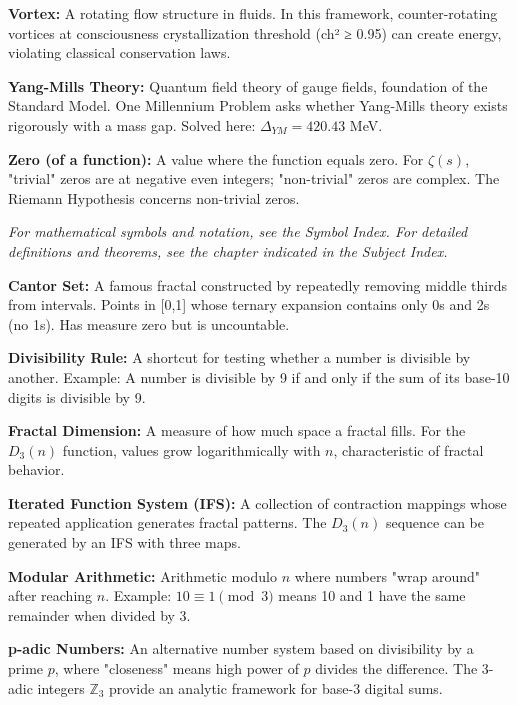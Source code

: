 \noindent\textbf{Vortex:} A rotating flow structure in fluids. In this framework, counter-rotating vortices at consciousness crystallization threshold (ch² ≥ 0.95) can create energy, violating classical conservation laws.

\noindent\textbf{Yang-Mills Theory:} Quantum field theory of gauge fields, foundation of the Standard Model. One Millennium Problem asks whether Yang-Mills theory exists rigorously with a mass gap. Solved here: $\Delta_{YM} = 420.43$ MeV.

\noindent\textbf{Zero (of a function):} A value where the function equals zero. For $\zeta(s)$, "trivial" zeros are at negative even integers; "non-trivial" zeros are complex. The Riemann Hypothesis concerns non-trivial zeros.

\vspace{1cm}

\noindent\textit{For mathematical symbols and notation, see the Symbol Index. For detailed definitions and theorems, see the chapter indicated in the Subject Index.}

\noindent\textbf{Cantor Set:} A famous fractal constructed by repeatedly removing middle thirds from intervals. Points in [0,1] whose ternary expansion contains only 0s and 2s (no 1s). Has measure zero but is uncountable.

\noindent\textbf{Divisibility Rule:} A shortcut for testing whether a number is divisible by another. Example: A number is divisible by 9 if and only if the sum of its base-10 digits is divisible by 9.

\noindent\textbf{Fractal Dimension:} A measure of how much space a fractal fills. For the $D_3(n)$ function, values grow logarithmically with $n$, characteristic of fractal behavior.

\noindent\textbf{Iterated Function System (IFS):} A collection of contraction mappings whose repeated application generates fractal patterns. The $D_3(n)$ sequence can be generated by an IFS with three maps.

\noindent\textbf{Modular Arithmetic:} Arithmetic modulo $n$ where numbers "wrap around" after reaching $n$. Example: $10 \equiv 1 \pmod{3}$ means 10 and 1 have the same remainder when divided by 3.

\noindent\textbf{p-adic Numbers:} An alternative number system based on divisibility by a prime $p$, where "closeness" means high power of $p$ divides the difference. The 3-adic integers $\mathbb{Z}_3$ provide an analytic framework for base-3 digital sums.

